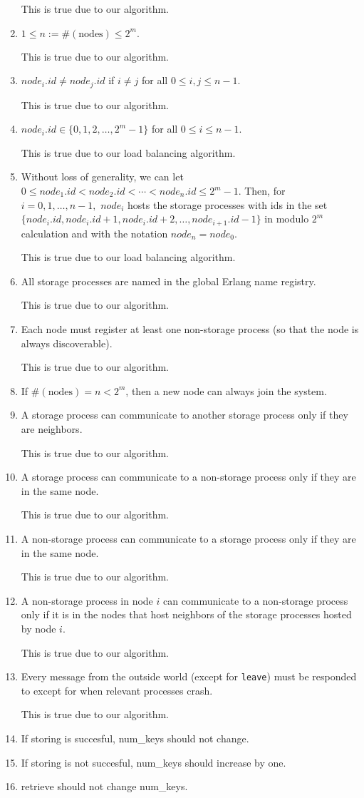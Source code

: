 \documentclass[11pt]{article}
\begin{document}
\begin{enumerate}[S1]
This is true due to our algorithm.
\item $1 \leq n:= \#(\text{nodes}) \leq 2^m.$

This is true due to our algorithm.
\item $node_i.id \neq node_j.id$ if $i\neq j$ for all $0\leq i,j \leq n - 1.$ 

This is true due to our algorithm.
\item $node_i.id \in \{0,1,2,\ldots, 2^m - 1\}$ for all $0\leq i \leq n - 1.$ 

This is true due to our load balancing algorithm.
\item Without loss of generality, we can let
$0 \leq node_1.id < node_2.id < \cdots < node_n.id \leq 2^m - 1.$
Then, for $i= 0, 1, \ldots, n - 1,$ $node_i$ hosts the storage processes with ids in the set $\{node_i.id, node_i.id + 1, node_i.id + 2, \ldots, node_{i+1}.id - 1\}$ in modulo $2^m$ calculation and with the notation $node_{n} = node_0.$

This is true due to our load balancing algorithm.
\item All storage processes are named in the global Erlang name registry.

This is true due to our algorithm.
\item Each node must register at least one non-storage process (so that the node is always discoverable).

This is true due to our algorithm.
\item If $\#(\text{nodes}) = n < 2^m$, then a new node can always join the system.

\item A storage process can communicate to another storage process only if they are neighbors.

This is true due to our algorithm.
\item  A storage process can communicate to a non-storage process only if they are in the same node.

This is true due to our algorithm.
\item A non-storage process can communicate to a storage process only if they are in the same node.

This is true due to our algorithm.
\item  A non-storage process in node $i$ can communicate to a non-storage process only if it is in the nodes that host neighbors of the storage processes hosted by node $i$.

This is true due to our algorithm.
\item Every message from the outside world (except for \texttt{leave}) must be responded to except for when relevant processes crash.

This is true due to our algorithm.

\item If storing is succesful, num\_keys should not change.

\item If storing is not succesful, num\_keys should increase by one.

\item retrieve should not change num\_keys.
\end{enumerate}
\end{document}

